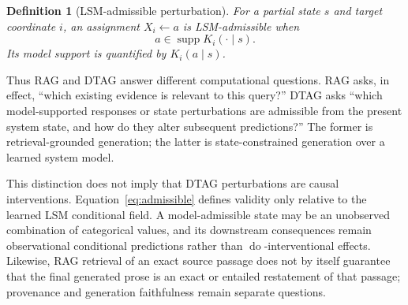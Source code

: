 \documentclass[journal]{IEEEtran}
\newtheorem{definition}{Definition}
\newcommand{\1}{\mathbf{1}}
\begin{document}
\begin{definition}[LSM-admissible perturbation]
For a partial state $s$ and target coordinate $i$, an assignment $X_i\leftarrow a$ is LSM-admissible when
\begin{equation}
  a\in\operatorname{supp}K_i(\cdot\mid s).
  \label{eq:admissible}
\end{equation}
Its model support is quantified by $K_i(a\mid s)$.
\end{definition}

Thus RAG and DTAG answer different computational questions. RAG asks, in effect, ``which existing evidence is relevant to this query?'' DTAG asks ``which model-supported responses or state perturbations are admissible from the present system state, and how do they alter subsequent predictions?'' The former is retrieval-grounded generation; the latter is state-constrained generation over a learned system model.

This distinction does not imply that DTAG perturbations are causal interventions. Equation~\eqref{eq:admissible} defines validity only relative to the learned LSM conditional field. A model-admissible state may be an unobserved combination of categorical values, and its downstream consequences remain observational conditional predictions rather than $\operatorname{do}$-interventional effects. Likewise, RAG retrieval of an exact source passage does not by itself guarantee that the final generated prose is an exact or entailed restatement of that passage; provenance and generation faithfulness remain separate questions.
\end{document}

